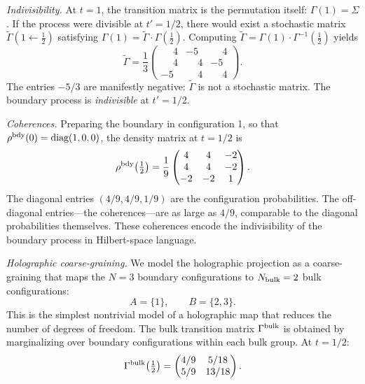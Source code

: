 \documentclass[aps,prd,twocolumn,superscriptaddress,nofootinbib]{revtex4-2}
\begin{document}
\emph{Indivisibility.} At $t = 1$, the transition matrix is the permutation itself: $\Gamma(1) = \Sigma$. If the process were divisible at $t' = 1/2$, there would exist a stochastic matrix $\tilde{\Gamma}(1 \leftarrow \tfrac{1}{2})$ satisfying $\Gamma(1) = \tilde{\Gamma} \cdot \Gamma(\tfrac{1}{2})$. Computing $\tilde{\Gamma} = \Gamma(1) \cdot \Gamma^{-1}(\tfrac{1}{2})$ yields
\begin{equation}
\tilde{\Gamma} = \frac{1}{3}\begin{pmatrix} \phantom{-}4 & -5 & \phantom{-}4 \\ \phantom{-}4 & \phantom{-}4 & -5 \\ -5 & \phantom{-}4 & \phantom{-}4 \end{pmatrix}.
\label{eq:Gamma_tilde}
\end{equation}
The entries $-5/3$ are manifestly negative: $\tilde{\Gamma}$ is not a stochastic matrix. The boundary process is \emph{indivisible} at $t' = 1/2$.

\emph{Coherences.} Preparing the boundary in configuration 1, so that $\rho^{\rm bdy}(0) = \text{diag}(1, 0, 0)$, the density matrix at $t = 1/2$ is
\begin{equation}
\rho^{\rm bdy}\!\left(\tfrac{1}{2}\right) = \frac{1}{9}\begin{pmatrix} 4 & 4 & -2 \\ 4 & 4 & -2 \\ -2 & -2 & 1 \end{pmatrix}.
\label{eq:rho_half}
\end{equation}
The diagonal entries $(4/9, 4/9, 1/9)$ are the configuration probabilities. The off-diagonal entries---the coherences---are as large as $4/9$, comparable to the diagonal probabilities themselves. These coherences encode the indivisibility of the boundary process in Hilbert-space language.

\emph{Holographic coarse-graining.} We model the holographic projection as a coarse-graining that maps the $N = 3$ boundary configurations to $N_{\rm bulk} = 2$ bulk configurations:
\begin{equation}
A = \{1\}, \qquad B = \{2, 3\}.
\label{eq:coarsegrain}
\end{equation}
This is the simplest nontrivial model of a holographic map that reduces the number of degrees of freedom. The bulk transition matrix $\Gamma^{\rm bulk}$ is obtained by marginalizing over boundary configurations within each bulk group. At $t = 1/2$:
\begin{equation}
\Gamma^{\rm bulk}\!\left(\tfrac{1}{2}\right) = \begin{pmatrix} 4/9 & 5/18 \\ 5/9 & 13/18 \end{pmatrix}.
\label{eq:Gamma_bulk_half}
\end{equation}
\end{document}
